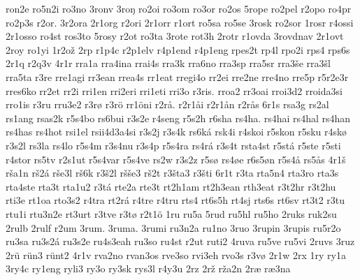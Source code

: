 {    ron2e
    ro5n2i
    ro3no
    3ronv
    3roŋ
    ro2oi
    ro3om
    ro3or
    ro2os
    5rope
    ro2pel
    r2opo
    ro4pr
    ro2p3s
    r2or.
    3r2ora
    2r1org
    r2ori
    2r1orr
    r1ort
    ro5sa
    ro5se
    3rosk
    ro2sor
    1rosr
    r4ossi
    2r1osso
    ro4st
    ros3to
    5rosy
    r2ot
    ro3ta
    3rote
    rot3h
    2rotr
    r1ovda
    3rovdnav
    2r1ovt
    2roy
    ro1yi
    1r2ož
    2rp
    r1p4c
    r2p1elv
    r4p1end
    r4p1eng
    rpes2t
    rp4l
    rpo2i
    rps4
    rps6s
    2r1q
    r2q3v
    4r1r
    rra1a
    rra4ina
    rrai4s
    rra3k
    rra6no
    rra3sp
    rra5sr
    rra3še
    rra3šl
    rra5ta
    r3re
    rre1agi
    rr3ean
    rrea4s
    rr1eat
    rregi4o
    rr2ei
    rre2ne
    rre4no
    rre5p
    r5r2e3r
    rres6ko
    rr2et
    rr2i
    rri1en
    rri2eri
    rri1eti
    rri3o
    r3ris.
    rroa2
    rr3oai
    rroi3d2
    rroida3si
    rro1is
    r3ru
    rru3e2
    r3rø
    r3rö
    rr1öni
    r2rå.
    r2r1åi
    r2r1ån
    r2rås
    6r1s
    rsa3g
    rs2al
    rs1ang
    rsas2k
    r5s4bo
    rs6bui
    r3s2e
    r4seng
    r5s2h
    r6sha
    rs4ha.
    rs4hai
    rs4hal
    rs4han
    rs4has
    rs4hot
    rsi1el
    rsii4d3a4si
    r3s2j
    r3s4k
    rs6ká
    rsk4i
    r4skoi
    r5skon
    r5sku
    r4skø
    r3s2l
    rs3la
    rs4lo
    r5s4m
    r3s4nu
    r3s4p
    r5s4ra
    rs4rá
    r3s4t
    rsta4st
    r5stá
    r5ste
    r5sti
    r4stor
    rs5tv
    r2s1ut
    r5s4var
    r5s4ve
    rs2w
    r3s2z
    r5sø
    rs4øe
    r6s5øn
    r5s4å
    rs5ås
    4r1š
    rša1n
    rš2á
    rše3l
    rš6k
    r3š2l
    ršše3
    rš2t
    r3šta3
    r3šti
    6r1t
    r3ta
    rta5n4
    rta3ro
    rta3s
    rta4ste
    rta3t
    rta1u2
    r3tá
    rte2a
    rte3t
    rt2h1am
    rt2h3ean
    rth3eat
    r3t2hr
    r3t2hu
    rti3e
    rt1oa
    rto3s2
    r4tra
    rt2rá
    r4tre
    r4tru
    rts4
    rt6s5h
    rt4sj
    rts6s
    rt6sv
    rt3t2
    r3tu
    rtu1i
    rtu3n2e
    rt3urt
    r3tve
    r3tø
    r2t1ö
    1ru
    ru5a
    5rud
    ru5hl
    ru5ho
    2ruks
    ruk2su
    2rulb
    2rulf
    r2um
    3rum.
    3ruma.
    3rumi
    ru3n2a
    ru1no
    3ruo
    3rupin
    3rupis
    ru5r2o
    ru3sa
    ru3s2á
    ru3s2e
    ru4s3eah
    ru3so
    ru4st
    r2ut
    ruti2
    4ruva
    ru5ve
    ru5vi
    2ruvs
    3ruz
    2rü
    rün3
    rünt2
    4r1v
    rva2no
    rvan3os
    rve3so
    rvi3eh
    rvo3s
    r3vø
    2r1w
    2rx
    1ry
    ry1a
    3ry4c
    ry1eng
    ryli3
    ry3o
    ry3sk
    rys3l
    r4y3u
    2rz
    2rž
    rža2n
    2ræ
    ræ3na
}
